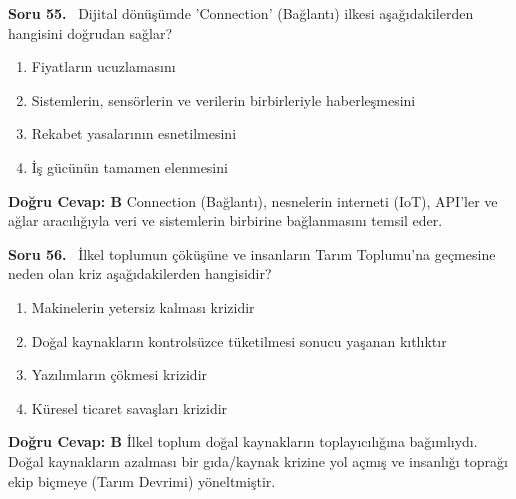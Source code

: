 \documentclass[11pt,a4paper,openany]{book}
\begin{document}
\needspace{5cm}
\vspace{8pt}
\noindent\textbf{\large\sffamily Soru 55.} \ Dijital dönüşümde 'Connection' (Bağlantı) ilkesi aşağıdakilerden hangisini doğrudan sağlar?
\begin{enumerate}[label=\Alph*), leftmargin=25pt, topsep=4pt, itemsep=2pt]
    \item Fiyatların ucuzlamasını
    \item Sistemlerin, sensörlerin ve verilerin birbirleriyle haberleşmesini
    \item Rekabet yasalarının esnetilmesini
    \item İş gücünün tamamen elenmesini
\end{enumerate}
\vspace{4pt}
\begin{tcolorbox}[title=Cevap ve Açıklama, colback=gray!3!white, colframe=primarycolor!90!black, arc=2mm, fonttitle=\bfseries\sffamily, top=6pt, bottom=6pt]
    \textbf{Doğru Cevap: B}
    \vspace{2pt}
    Connection (Bağlantı), nesnelerin interneti (IoT), API'ler ve ağlar aracılığıyla veri ve sistemlerin birbirine bağlanmasını temsil eder.
\end{tcolorbox}
\vspace{10pt}

\needspace{5cm}
\vspace{8pt}
\noindent\textbf{\large\sffamily Soru 56.} \ İlkel toplumun çöküşüne ve insanların Tarım Toplumu'na geçmesine neden olan kriz aşağıdakilerden hangisidir?
\begin{enumerate}[label=\Alph*), leftmargin=25pt, topsep=4pt, itemsep=2pt]
    \item Makinelerin yetersiz kalması krizidir
    \item Doğal kaynakların kontrolsüzce tüketilmesi sonucu yaşanan kıtlıktır
    \item Yazılımların çökmesi krizidir
    \item Küresel ticaret savaşları krizidir
\end{enumerate}
\vspace{4pt}
\begin{tcolorbox}[title=Cevap ve Açıklama, colback=gray!3!white, colframe=primarycolor!90!black, arc=2mm, fonttitle=\bfseries\sffamily, top=6pt, bottom=6pt]
    \textbf{Doğru Cevap: B}
    \vspace{2pt}
    İlkel toplum doğal kaynakların toplayıcılığına bağımlıydı. Doğal kaynakların azalması bir gıda/kaynak krizine yol açmış ve insanlığı toprağı ekip biçmeye (Tarım Devrimi) yöneltmiştir.
\end{tcolorbox}
\vspace{10pt}
\end{document}
